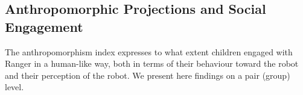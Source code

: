 \documentclass[letterpaper, 10pt, conference]{ieeeconf}
\begin{document}
\subsection{Anthropomorphic Projections and Social Engagement}

The anthropomorphism index expresses to what extent children engaged with Ranger
in a human-like way, both in terms of their behaviour toward the robot and their
perception of the robot. We present here findings on a pair (group) level.

\end{document}
